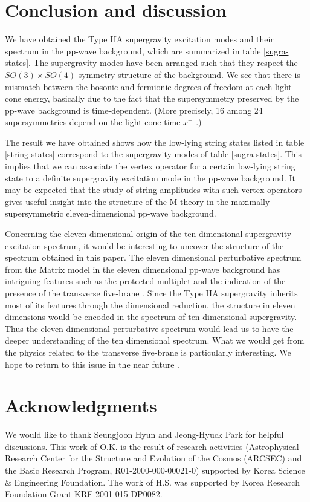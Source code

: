 \documentclass[a4paper,12pt]{article}
\numberwithin{equation}{section}
\begin{document}
\section{Conclusion and discussion}
\label{concl}

We have obtained the Type IIA supergravity excitation modes and their
spectrum in the pp-wave background, which are summarized in table
\ref{sugra-states}.  The supergravity modes have been arranged such
that they respect the $SO(3) \times SO(4)$ symmetry structure of the
background.  We see that there is mismatch between the bosonic and
fermionic degrees of freedom at each light-cone energy, basically due
to the fact that the supersymmetry preserved by the pp-wave background
is time-dependent. (More precisely, 16 among 24 supersymmetries depend
on the light-cone time $x^+$ \cite{hyu074}.)

The result we have obtained shows how the low-lying string states
listed in table \ref{string-states} correspond to the supergravity
modes of table \ref{sugra-states}.  This implies that we can associate
the vertex operator for a certain low-lying string state to a definite
supergravity excitation mode in the pp-wave background.  It may be
expected that the study of string amplitudes with such vertex
operators gives useful insight into the structure of the M theory in
the maximally supersymmetric eleven-dimensional pp-wave background.

Concerning the eleven dimensional origin of the ten dimensional
supergravity excitation spectrum, it would be interesting to uncover
the structure of the spectrum obtained in this paper.  The eleven
dimensional perturbative spectrum from the Matrix model in the eleven
dimensional pp-wave background has intriguing features such as the
protected multiplet and the indication of the presence of the
transverse five-brane \cite{das050,mal139}.  Since the Type IIA
supergravity inherits most of its features through the dimensional
reduction, the structure in eleven dimensions would be encoded in the
spectrum of ten dimensional supergravity.  Thus the eleven dimensional
perturbative spectrum would lead us to have the deeper understanding
of the ten dimensional spectrum.  What we would get from the physics
related to the transverse five-brane is particularly interesting.  We
hope to return to this issue in the near future \cite{kwo}.




\section*{Acknowledgments}
We would like to thank Seungjoon Hyun and Jeong-Hyuck Park for helpful
discussions.  This work of O.K. is the result of research activities
(Astrophysical Research Center for the Structure and Evolution of the
Cosmos (ARCSEC) and the Basic Research Program, R01-2000-000-00021-0)
supported by Korea Science $\&$ Engineering Foundation.  The work of
H.S. was supported by Korea Research Foundation Grant
KRF-2001-015-DP0082.
\end{document}

